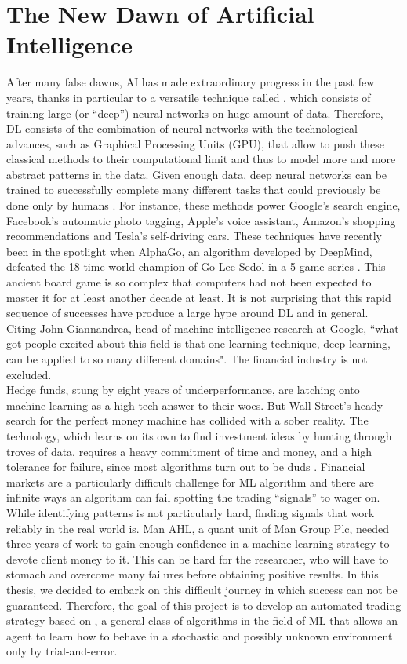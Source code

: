 \section{The New Dawn of Artificial Intelligence}
After many false dawns, \gls{AI} has made extraordinary progress in the past few years, thanks in particular to a versatile technique called , which consists of training large (or ``deep'') neural networks on huge amount of data. Therefore, \gls{DL} consists of the combination of neural networks with the technological advances, such as Graphical Processing Units (GPU), that allow to push these classical methods to their computational limit and thus to model more and more abstract patterns in the data. Given enough data, deep neural networks can be trained to successfully complete many different tasks that could previously be done only by humans \cite{economist2016march}. For instance, these methods power Google's search engine, Facebook's automatic photo tagging, Apple's voice assistant, Amazon's shopping recommendations and Tesla's self-driving cars. These techniques have recently been in the spotlight when AlphaGo, an algorithm developed by DeepMind, defeated the 18-time world champion of Go Lee Sedol in a 5-game series \cite{silver2016mastering}. This ancient board game is so complex that computers had not been expected to master it for at least another decade at least. It is not surprising that this rapid sequence of successes have produce a large hype around \gls{DL} and  in general. Citing John Giannandrea, head of machine-intelligence research at Google, ``what got people excited about this field is that one learning technique, deep learning, can be applied to so many different domains". The financial industry is not excluded.\\
Hedge funds, stung by eight years of underperformance, are latching onto machine learning as a high-tech answer to their woes. But Wall Street’s heady search for the perfect money machine has collided with a sober reality. The technology, which learns on its own to find investment ideas by hunting through troves of data, requires a heavy commitment of time and money, and a high tolerance for failure, since most algorithms turn out to be duds \cite{bloomberg2016ml}. Financial markets are a particularly difficult challenge for \gls{ML} algorithm and there are infinite ways an algorithm can fail spotting the trading ``signals'' to wager on. While identifying patterns is not particularly hard, finding signals that work reliably in the real world is. Man AHL, a quant unit of Man Group Plc, needed three years of work to gain enough confidence in a machine learning strategy to devote client money to it. This can be hard for the researcher, who will have to stomach and overcome many failures before obtaining positive results. In this thesis, we decided to embark on this difficult journey in which success can not be guaranteed. Therefore, the goal of this project is to develop an automated trading strategy based on , a general class of algorithms in the field of \gls{ML} that allows an agent to learn how to behave in a stochastic and possibly unknown environment only by trial-and-error. 

